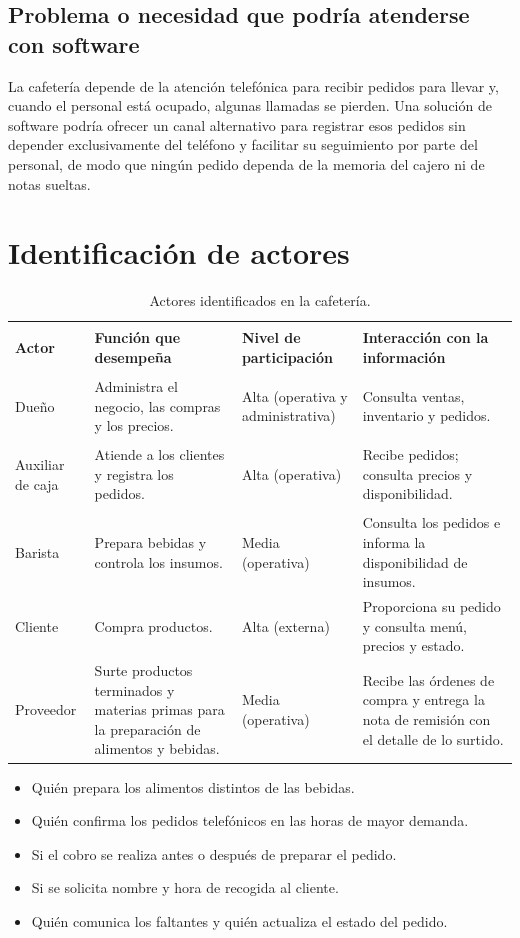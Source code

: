 \documentclass[12pt,letterpaper]{article}
\newcommand{\thd}[1]{\sffamily\bfseries #1}
\newcommand{\cab}{\rowcolor{black!18}}
\begin{document}
\subsection*{Problema o necesidad que podría atenderse con software}

La cafetería depende de la atención telefónica para recibir pedidos para llevar y, cuando el personal está ocupado, algunas llamadas se pierden. Una solución de software podría ofrecer un canal alternativo para registrar esos pedidos sin depender exclusivamente del teléfono y facilitar su seguimiento por parte del personal, de modo que ningún pedido dependa de la memoria del cajero ni de notas sueltas.

\section{Identificación de actores}

\begin{table}[H]
\centering
\small
\begin{tabularx}{\textwidth}{>{\bfseries\raggedright\arraybackslash}p{2.1cm}Y>{\raggedright\arraybackslash}p{2.7cm}Y}
\cab \thd{Actor} & \thd{Función que desempeña} & \thd{Nivel de participación} & \thd{Interacción con la información}\\
Dueño & Administra el negocio, las compras y los precios. & Alta (operativa y administrativa) & Consulta ventas, inventario y pedidos.\\
Auxiliar de caja & Atiende a los clientes y registra los pedidos. & Alta (operativa) & Recibe pedidos; consulta precios y disponibilidad.\\
Barista & Prepara bebidas y controla los insumos. & Media (operativa) & Consulta los pedidos e informa la disponibilidad de insumos.\\
Cliente & Compra productos. & Alta (externa) & Proporciona su pedido y consulta menú, precios y estado.\\
Proveedor & Surte productos terminados y materias primas para la preparación de alimentos y bebidas. & Media (operativa) & Recibe las órdenes de compra y entrega la nota de remisión con el detalle de lo surtido.\\
\end{tabularx}
\caption{Actores identificados en la cafetería.}
\end{table}

\begin{nota}[title=Aspectos por confirmar con la cafetería]
\begin{itemize}
\item Quién prepara los alimentos distintos de las bebidas.
\item Quién confirma los pedidos telefónicos en las horas de mayor demanda.
\item Si el cobro se realiza antes o después de preparar el pedido.
\item Si se solicita nombre y hora de recogida al cliente.
\item Quién comunica los faltantes y quién actualiza el estado del pedido.
\end{itemize}
\end{nota}
\end{document}
